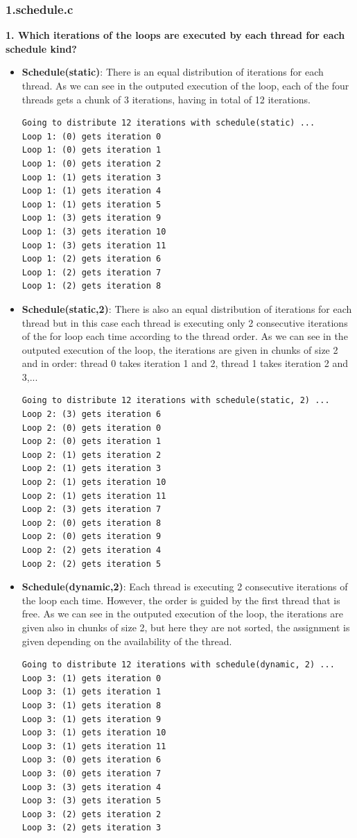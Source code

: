 \documentclass[12]{article}
\begin{document}
\subsubsection{1.schedule.c}
\textbf{1. Which iterations of the loops are executed by each thread for each schedule kind?}
\begin{itemize}
\item \textbf{Schedule(static)}: There is an equal distribution of iterations for each thread. As we can see in the outputed execution of the loop, each of the four threads gets a chunk of 3 iterations, having in total of 12 iterations. 
\\
\begin{lstlisting}[frame=single]
Going to distribute 12 iterations with schedule(static) ...
Loop 1: (0) gets iteration 0
Loop 1: (0) gets iteration 1
Loop 1: (0) gets iteration 2
Loop 1: (1) gets iteration 3
Loop 1: (1) gets iteration 4
Loop 1: (1) gets iteration 5
Loop 1: (3) gets iteration 9
Loop 1: (3) gets iteration 10
Loop 1: (3) gets iteration 11
Loop 1: (2) gets iteration 6
Loop 1: (2) gets iteration 7
Loop 1: (2) gets iteration 8
\end{lstlisting}

\item \textbf{Schedule(static,2)}: There is also an equal distribution of iterations for each thread but in this case each thread is executing only 2 consecutive iterations of the for loop each time according to the thread order.
As we can see in the outputed execution of the loop, the iterations are given in chunks of size 2 and in order: thread 0 takes iteration 1 and 2, thread 1 takes iteration 2 and 3,...
\\
\begin{lstlisting}[frame=single]
Going to distribute 12 iterations with schedule(static, 2) ...
Loop 2: (3) gets iteration 6
Loop 2: (0) gets iteration 0
Loop 2: (0) gets iteration 1
Loop 2: (1) gets iteration 2
Loop 2: (1) gets iteration 3
Loop 2: (1) gets iteration 10
Loop 2: (1) gets iteration 11
Loop 2: (3) gets iteration 7
Loop 2: (0) gets iteration 8
Loop 2: (0) gets iteration 9
Loop 2: (2) gets iteration 4
Loop 2: (2) gets iteration 5
\end{lstlisting}


\item \textbf{Schedule(dynamic,2)}: Each thread is executing 2 consecutive iterations of the loop each time. However, the order is guided by the first thread that is free. 
As we can see in the outputed execution of the loop, the iterations are given also in chunks of size 2, but here they are not sorted, the assignment is given depending on the availability of the thread. 
\\
\begin{lstlisting}[frame=single]
Going to distribute 12 iterations with schedule(dynamic, 2) ...
Loop 3: (1) gets iteration 0
Loop 3: (1) gets iteration 1
Loop 3: (1) gets iteration 8
Loop 3: (1) gets iteration 9
Loop 3: (1) gets iteration 10
Loop 3: (1) gets iteration 11
Loop 3: (0) gets iteration 6
Loop 3: (0) gets iteration 7
Loop 3: (3) gets iteration 4
Loop 3: (3) gets iteration 5
Loop 3: (2) gets iteration 2
Loop 3: (2) gets iteration 3
\end{lstlisting}


\end{itemize}
\end{document}
